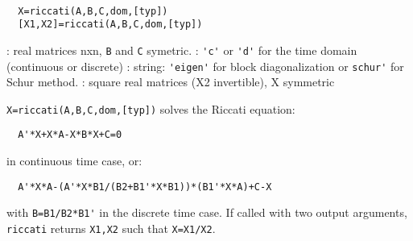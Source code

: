 \begin{mandesc}
   \\ %
\end{mandesc}
\begin{calling_sequence}
\begin{verbatim}
  X=riccati(A,B,C,dom,[typ])  
  [X1,X2]=riccati(A,B,C,dom,[typ])  
\end{verbatim}
\end{calling_sequence}
\begin{parameters}
  \begin{varlist}
    : real matrices nxn, \verb!B! and  \verb!C! symetric.
    : \verb!'c'! or \verb!'d'! for the time domain (continuous or discrete)
    : string: \verb!'eigen'! for block diagonalization or \verb!schur'! for  Schur method.
    : square real matrices (X2 invertible), X symmetric
  \end{varlist}
\end{parameters}
\begin{mandescription}
  \verb!X=riccati(A,B,C,dom,[typ])! solves the Riccati equation:
\begin{verbatim}
  A'*X+X*A-X*B*X+C=0 
\end{verbatim}
  in continuous time case, or:
\begin{verbatim}
  A'*X*A-(A'*X*B1/(B2+B1'*X*B1))*(B1'*X*A)+C-X
\end{verbatim}
  with \verb!B=B1/B2*B1'! in the discrete time case.
  If called with two output arguments, \verb!riccati! returns \verb!X1,X2!
  such that \verb!X=X1/X2!.
\end{mandescription}
\begin{manseealso}
     
\end{manseealso}
